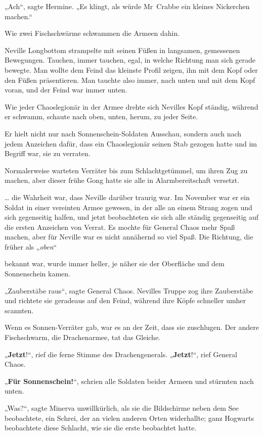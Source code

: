 {„Ach“, sagte Hermine. „Es klingt, als würde Mr~Crabbe ein kleines Nickerchen machen.“

Wie zwei Fischschwärme schwammen die Armeen dahin.

Neville Longbottom strampelte mit seinen Füßen in langsamen, gemessenen Bewegungen. Tauchen, immer tauchen, egal, in welche Richtung man sich gerade bewegte. Man wollte dem Feind das kleinste Profil zeigen, ihn mit dem Kopf oder den Füßen präsentieren. Man tauchte also immer, nach unten und mit dem Kopf voran, und der Feind war immer unten.

Wie jeder Chaoslegionär in der Armee drehte sich Nevilles Kopf ständig, während er schwamm, schaute nach oben, unten, herum, zu jeder Seite.

Er hielt nicht nur nach Sonnenschein-Soldaten Ausschau, sondern auch nach jedem Anzeichen dafür, dass ein Chaoslegionär seinen Stab gezogen hatte und im Begriff war, sie zu verraten.

Normalerweise warteten Verräter bis zum Schlachtgetümmel, um ihren Zug zu machen, aber dieser frühe Gong hatte sie alle in Alarmbereitschaft versetzt.

… die Wahrheit war, dass Neville darüber traurig war. Im November war er ein Soldat in einer vereinten Armee gewesen, in der alle an einem Strang zogen und sich gegenseitig halfen, und jetzt beobachteten sie sich alle ständig gegenseitig auf die ersten Anzeichen von Verrat. Es mochte für General Chaos mehr Spaß machen, aber für Neville war es nicht annähernd so viel Spaß. Die Richtung, die früher als „\emph{oben}“

bekannt war, wurde immer heller, je näher sie der Oberfläche und dem Sonnenschein kamen.

„Zauberstäbe raus“, sagte General Chaos. Nevilles Truppe zog ihre Zauberstäbe und richtete sie geradeaus auf den Feind, während ihre Köpfe schneller umher scannten.

Wenn es Sonnen-Verräter gab, war es an der Zeit, dass sie zuschlugen. Der andere Fischschwarm, die Drachenarmee, tat das Gleiche.

„\textbf{Jetzt}!“, rief die ferne Stimme des Drachengenerals. „\textbf{Jetzt}!“, rief General Chaos.

„\textbf{Für Sonnenschein!}“, schrien alle Soldaten beider Armeen und stürmten nach unten.

„Was?“, sagte Minerva unwillkürlich, als sie die Bildschirme neben dem See beobachtete, ein Schrei, der an vielen anderen Orten widerhallte; ganz Hogwarts beobachtete diese Schlacht, wie sie die erste beobachtet hatte.

}
